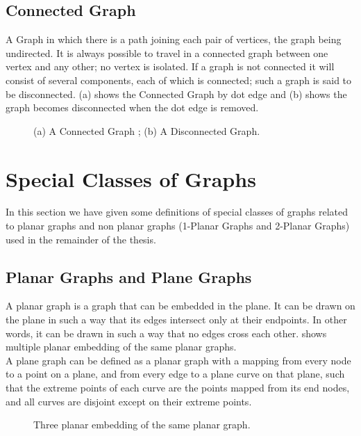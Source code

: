 \subsection{Connected Graph}
A Graph in which there is a path joining each pair of vertices, the graph being undirected. It is always possible to travel in a connected graph between one vertex and any other; no vertex is isolated. If a graph is not connected it will consist of several components, each of which is connected; such a graph is said to be disconnected.  (a) shows the Connected Graph by dot edge and (b) shows the graph becomes disconnected when the dot edge is removed.


\begin{figure}[!tb]
  \centering
\resizebox{150mm}{!}{}
\caption{(a) A Connected Graph ; (b) A Disconnected Graph.}
\label{fig:connectivity}
\end{figure}




\section{Special Classes of Graphs}
\label{special}

In this section we have given some definitions of special classes of graphs related
to planar graphs and non planar graphs (1-Planar Graphs and 2-Planar Graphs) used in the remainder of the thesis.


\subsection{Planar Graphs and Plane Graphs}

A planar graph is a graph that can be embedded in the plane. It can be drawn on the plane in such a way that its edges intersect only at their endpoints. In other words, it can be drawn in such a way that no edges cross each other.  shows multiple planar embedding of the same planar graphs.
\\

A plane graph can be defined as a planar graph with a mapping from every node to a point on a plane, and from every edge to a plane curve on that plane, such that the extreme points of each curve are the points mapped from its end nodes, and all curves are disjoint except on their extreme points.

\begin{figure}[!tb]
  \centering
\resizebox{150mm}{!}{}
\caption{Three planar embedding of the same planar graph.}
\label{fig:planar}
\end{figure}



